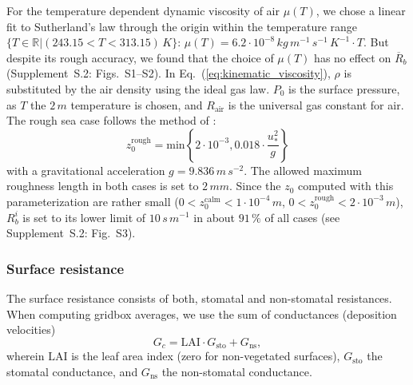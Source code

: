 \documentclass[gmd, manuscript]{copernicus}
\begin{document}
For the temperature dependent dynamic viscosity of air $\mu(T)$, we chose a linear fit to Sutherland's law through the origin within the temperature range $\{T \in \mathbb{R} | (243.15 < T < 313.15)\,\unit{K}\}$: $\mu(T) = 6.2\cdot 10^{-8}\,\unit{kg\,m^{-1}\,s^{-1}\,K^{-1}} \cdot T$. But despite its rough accuracy, we found that the choice of $\mu(T)$ has no effect on $\overline{R}_b$ (Supplement~S.2: Figs.~S1--S2). In Eq.~(\ref{eq:kinematic_viscosity}), $\rho$ is substituted by the air density using the ideal gas law. $P_0$ is the surface pressure, as $T$ the $2\,\unit{m}$ temperature is chosen, and $R_\text{air}$ is the universal gas constant for air.
The rough sea case follows the method of \citet{QJRMS:Charnock1955,JPO:Wu1980}:
\begin{equation}
  z_0^\text{rough} = \text{min}\left\{2\cdot10^{-3}, 0.018 \cdot \frac{u^2_*}{g}\right\}
\end{equation}
with a gravitational acceleration $g = 9.836\,\unit{m\,s^{-2}}$. The allowed maximum roughness length in both cases is set to $2\,\unit{mm}$. Since the $z_0$ computed with this parameterization are rather small ($0 < z_0^\text{calm} < 1\cdot 10^{-4}\,\unit{m}$, $0 < z_0^\text{rough} < 2 \cdot 10^{-3}\,\unit{m}$), $R^i_b$ is set to its lower limit of $10\,\unit{s\,m^{-1}}$ in about $91\,\unit{\%}$ of all cases (see Supplement~S.2: Fig.~S3). 
\subsubsection{Surface resistance}
\label{subsubsec:Rc}
The surface resistance consists of both, stomatal and non-stomatal resistances. When computing gridbox averages, we use the sum of conductances (deposition velocities)
\begin{equation}
  G_c = \text{LAI} \cdot G_\text{sto} + G_\text{ns}, 
\end{equation}
wherein $\text{LAI}$ is the leaf area index (zero for non-vegetated surfaces), $G_\text{sto}$ the stomatal conductance, and $G_\text{ns}$ the non-stomatal conductance.
\end{document}
